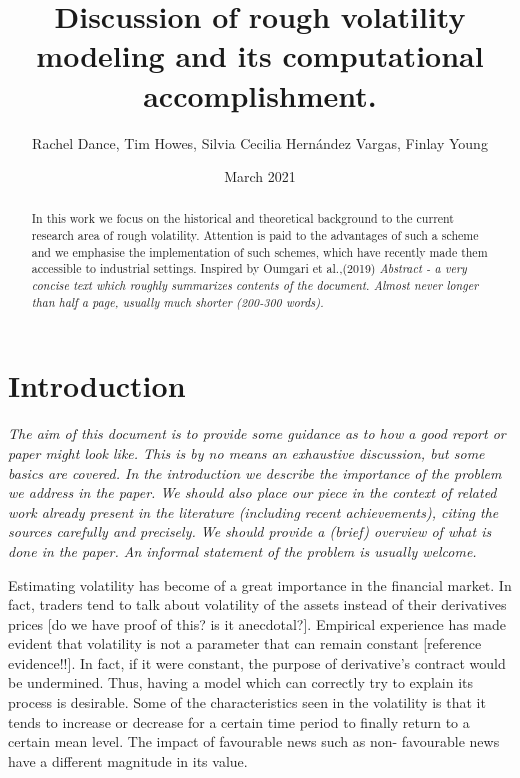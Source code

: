 \documentclass[12pt,oneside]{article}
\title{Discussion of rough volatility modeling and its computational accomplishment.}
\date{ March 2021 }
\author{Rachel Dance, Tim Howes, Silvia Cecilia Hernández Vargas, Finlay Young}
\begin{document}
  \maketitle

  \begin{abstract}In this work we focus on the historical and theoretical background to the current research area of rough volatility. Attention is paid to the advantages of such a scheme and we emphasise the implementation of such schemes, which have recently made them accessible to industrial settings. Inspired by Oumgari et al.,(2019) \cite{jacquier2020deep} 
  \emph{Abstract - a very concise text which roughly summarizes contents of the document.  Almost never longer than half a page, usually much shorter (200-300 words).}
   \end{abstract}


  \tableofcontents
 \newpage

\section{Introduction}
\emph{The aim of this document is to provide some guidance as to how a good report or paper might look like. 
This is by no means an  exhaustive discussion, but some basics are covered. 
In the introduction we describe the importance of the problem we address in the paper. We should also place our piece in the context of related work already present in the literature (including recent achievements), citing the sources carefully and precisely.
We should provide a (brief) overview of what is done in the paper. 
An informal statement of the problem is usually welcome.}

Estimating volatility has become of a great importance in the financial market. In fact, traders tend to talk about volatility of the assets instead of their derivatives prices [do we have proof of this? is it anecdotal?]. Empirical experience has made evident that volatility is not a parameter that can remain constant [reference evidence!!]. In fact, if it were constant, the purpose of derivative's contract would be undermined. Thus, having a model which can correctly try to explain its process is desirable. Some of the characteristics seen in the volatility is that it tends to increase or decrease for a certain time period to finally return to a certain mean level. The impact of favourable news such as non- favourable news have a different magnitude in its value.
\end{document}
